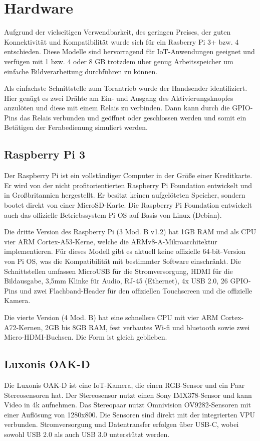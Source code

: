 \section{Hardware}
Aufgrund der vielseitigen Verwendbarkeit, des geringen Preises, der guten Konnektivität und Kompatibilität wurde sich für ein Rasberry Pi 3+ bzw. 4 entschieden. Diese Modelle sind hervorragend für IoT-Anwendungen geeignet und verfügen mit 1 bzw. 4 oder 8 GB trotzdem über genug Arbeitsspeicher um einfache Bildverarbeitung durchführen zu können. 

Als einfachste Schnittstelle zum Torantrieb wurde der Handsender identifiziert. Hier genügt es zwei Drähte am Ein- und Ausgang des Aktivierungsknopfes anzulöten und diese mit einem Relais zu verbinden. Dann kann durch die \ac{GPIO}-Pins das Relais verbunden und geöffnet oder geschlossen werden und somit ein Betätigen der Fernbedienung simuliert werden.


\subsection{Raspberry Pi 3}
Der Raspberry Pi ist ein vollständiger Computer in der Größe einer Kreditkarte. Er wird von der nicht profitorientierten Raspberry Pi Foundation entwickelt und in Großbritannien hergestellt. Er besitzt keinen aufgelöteten Speicher, sondern bootet direkt von einer MicroSD-Karte. Die Raspberry Pi Foundation entwickelt auch das offizielle Betriebssystem Pi OS auf Basis von Linux (Debian).

Die dritte Version des Raspberry Pi (3 Mod. B v1.2) hat 1GB RAM und als CPU vier ARM Cortex-A53-Kerne, welche die ARMv8-A-Mikroarchitektur implementieren. Für dieses Modell gibt es aktuell keine offizielle 64-bit-Version von Pi OS, was die Kompatibilität mit bestimmter Software einschränkt.
Die Schnittstellen umfassen MicroUSB für die Stromversorgung, HDMI für die Bildausgabe, 3,5mm Klinke für Audio, RJ-45 (Ethernet), 4x USB 2.0, 26 \ac{GPIO}-Pins und zwei Flachband-Header für den offiziellen Touchscreen und die offizielle Kamera.

Die vierte Version (4 Mod. B) hat eine schnellere CPU mit vier ARM Cortex-A72-Kernen, 2GB bis 8GB RAM, fest verbautes Wi-fi und bluetooth sowie zwei Micro-HDMI-Buchsen. Die Form ist gleich geblieben.

\subsection{Luxonis OAK-D}
Die Luxonis OAK-D ist eine IoT-Kamera, die einen RGB-Sensor und ein Paar Stereosensoren hat. Der Stereosensor nutzt einen Sony IMX378-Sensor und kann Video in 4k aufnehmen. Das Stereopaar nutzt Omnivision OV9282-Sensoren mit einer Auflösung von 1280x800.
Die Sensoren sind direkt mit der integrierten \ac{VPU} verbunden. Stromversorgung und Datentransfer erfolgen über USB-C, wobei sowohl USB 2.0 als auch USB 3.0 unterstützt werden.

